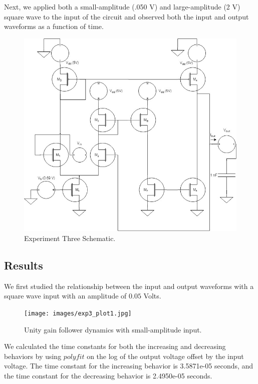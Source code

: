 \documentclass{article}
\begin{document}
Next, we applied both a small-amplitude (.050 V) and large-amplitude (2 V) square wave to the input of the circuit and observed both the input and output waveforms as a function of time. 
\begin{figure}[H]
  \begin{center}      
  \includegraphics[scale = 0.5]{images/exp3_schematic.jpg}
  \caption{Experiment Three Schematic.}   
  \label{fig:exp1_schematic}
  \end{center}
\end{figure}

\subsection{Results}
We first studied the relationship between the input and output waveforms with a square wave input with an amplitude of $0.05$ Volts. 
\begin{figure}[H]
  \begin{center}      
  \texttt{[image: images/exp3\_plot1.jpg]}
  \caption{Unity gain follower dynamics with small-amplitude input.}   
  \label{fig:exp1_schematic}
  \end{center}
\end{figure}
We calculated the time constants for both the increasing and decreasing behaviors by using $polyfit$ on the log of the output voltage offset by the input voltage. The time constant for the increasing behavior is 3.5871e-05 seconds, and the time constant for the decreasing behavior is 2.4950e-05 seconds.
\end{document}
